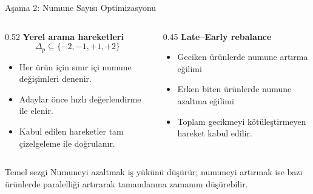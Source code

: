 \documentclass[aspectratio=169,11pt]{beamer}
\begin{document}
\begin{frame}{Aşama 2: Numune Sayısı Optimizasyonu}
  \begin{columns}[T,totalwidth=\textwidth]
    \begin{column}{0.52\textwidth}
      \textbf{Yerel arama hareketleri}
      \[
      \Delta_p\subseteq\{-2,-1,+1,+2\}
      \]
      \begin{itemize}
        \item Her ürün için sınır içi numune değişimleri denenir.
        \item Adaylar önce hızlı değerlendirme ile elenir.
        \item Kabul edilen hareketler tam çizelgeleme ile doğrulanır.
      \end{itemize}
    \end{column}
    \begin{column}{0.45\textwidth}
      \textbf{Late--Early rebalance}
      \begin{itemize}
        \item Geciken ürünlerde numune artırma eğilimi
        \item Erken biten ürünlerde numune azaltma eğilimi
        \item Toplam gecikmeyi kötüleştirmeyen hareket kabul edilir.
      \end{itemize}
    \end{column}
  \end{columns}

  \vspace{3mm}
  \begin{alertblock}{Temel sezgi}
    Numuneyi azaltmak iş yükünü düşürür; numuneyi artırmak ise bazı ürünlerde paralelliği artırarak tamamlanma zamanını düşürebilir.
  \end{alertblock}
\end{frame}
\end{document}
